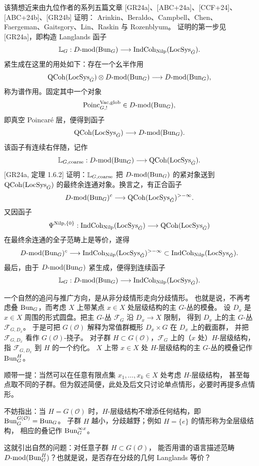 该猜想近来由九位作者的系列五篇文章 [GR24a]、[ABC+24a]、[CCF+24]、[ABC+24b]、[GR24b] 证明：
Arinkin、Beraldo、Campbell、Chen、Faergeman、Gaitsgory、Lin、Raskin 与 Rozenblyum。
证明的第一步见 [GR24a]，即构造 Langlands 函子
\[
\mathbb{L}_G:D\text{-}\mathrm{mod}(\mathrm{Bun}_G)\longrightarrow\mathrm{IndCoh}_{\mathrm{Nilp}}(\mathrm{LocSys}_{\check{G}}).
\]
紧生成在这里的用处如下：存在一个幺半作用
\[
\mathrm{QCoh}(\mathrm{LocSys}_{\check{G}})\otimes D\text{-}\mathrm{mod}(\mathrm{Bun}_G)\longrightarrow D\text{-}\mathrm{mod}(\mathrm{Bun}_G),
\]
称为谱作用。固定其中一个对象
\[
\mathrm{Poinc}^{\mathrm{Vac},\mathrm{glob}}_{G,!}\in D\text{-}\mathrm{mod}(\mathrm{Bun}_G),
\]
即真空 Poincaré 层，便得到函子
\[
\mathrm{QCoh}(\mathrm{LocSys}_{\check{G}})\longrightarrow D\text{-}\mathrm{mod}(\mathrm{Bun}_G).
\]
该函子有连续右伴随，记作
\[
\mathbb{L}_{G,\mathrm{coarse}}:D\text{-}\mathrm{mod}(\mathrm{Bun}_G)\longrightarrow\mathrm{QCoh}(\mathrm{LocSys}_{\check{G}}).
\]
[GR24a, 定理 1.6.2] 证明：$\mathbb{L}_{G,\mathrm{coarse}}$ 把 $D\text{-}\mathrm{mod}(\mathrm{Bun}_G)$ 的紧对象送到
$\mathrm{QCoh}(\mathrm{LocSys}_{\check{G}})$ 的最终余连通对象。换言之，有正合函子
\[
D\text{-}\mathrm{mod}(\mathrm{Bun}_G)^{c}\longrightarrow\mathrm{QCoh}(\mathrm{LocSys}_{\check{G}})^{>-\infty}.
\]
又因函子
\[
\Psi^{\mathrm{Nilp},\{0\}}:\mathrm{IndCoh}_{\mathrm{Nilp}}(\mathrm{LocSys}_{\check{G}})\longrightarrow\mathrm{QCoh}(\mathrm{LocSys}_{\check{G}})
\]
在最终余连通的全子范畴上是等价，遂得
\[
D\text{-}\mathrm{mod}(\mathrm{Bun}_G)^{c}\longrightarrow\mathrm{IndCoh}_{\mathrm{Nilp}}(\mathrm{LocSys}_{\check{G}})^{>-\infty}
\subset\mathrm{IndCoh}_{\mathrm{Nilp}}(\mathrm{LocSys}_{\check{G}}).
\]
最后，由于 $D\text{-}\mathrm{mod}(\mathrm{Bun}_G)$ 紧生成，便得到连续函子
\[
\mathbb{L}_G:D\text{-}\mathrm{mod}(\mathrm{Bun}_G)\longrightarrow\mathrm{IndCoh}_{\mathrm{Nilp}}(\mathrm{LocSys}_{\check{G}}).
\]

一个自然的追问与推广方向，是从非分歧情形走向分歧情形。
也就是说，不再考虑叠 $\mathrm{Bun}_G$，而考虑 $X$ 上带某点 $x\in X$ 处层级结构的主 $G$-丛的模叠。
设 $D_x$ 是 $x\in X$ 周围的形式圆盘。把主 $G$-丛 $\mathcal{F}_G$ 沿 $D_x\to X$ 限制，
得到 $D_x$ 上的主 $G$-丛 $\mathcal{F}_{G,D_x}$。
于是可把 $G(\mathcal{O})$ 解释为常值群概形 $D_x\times G$ 在 $D_x$ 上的截面群，
并把 $\mathcal{F}_{G,D_x}$ 看作 $G(\mathcal{O})$-挠子。
对子群 $H\subset G(\mathcal{O})$，$\mathcal{F}_G$ 上的（$x$ 处）$H$-层级结构，
指 $\mathcal{F}_{G,D_x}$ 到 $H$ 的一个约化。
$X$ 上带 $x\in X$ 处 $H$-层级结构的主 $G$-丛的模叠记作 $\mathrm{Bun}^H_G$。

顺带一提：当然可以在任意有限点集 $x_1,\dots,x_k\in X$ 处考虑 $H$-层级结构，
甚至每点取不同的子群。但为叙述简便，此处及后文只讨论单点情形，必要时再提多点情形。

不妨指出：当 $H=G(\mathcal{O})$ 时，$H$-层级结构不增添任何结构，即
$\mathrm{Bun}^{G(\mathcal{O})}_G=\mathrm{Bun}_G$。
子群 $H$ 越小，分歧越野；例如 $H=\{e\}$ 的情形称为全层级结构，
相应的叠记作 $\mathrm{Bun}^{\infty x}_G$。

这就引出自然的问题：对任意子群 $H\subset G(\mathcal{O})$，
能否用谱的语言描述范畴 $D\text{-}\mathrm{mod}(\mathrm{Bun}^H_G)$？也就是说，是否存在分歧的几何 Langlands 等价？

